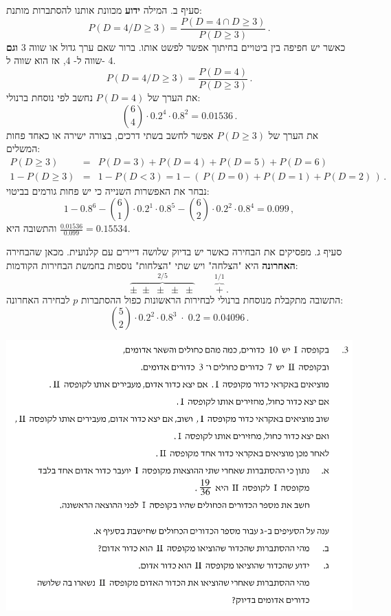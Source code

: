 \documentclass[12pt,a4paper]{article}
\begin{document}
סעיף ב. המילה
\textbf{ידוע}
מכוונת אותנו להסתברות מותנת:
\[
P(D=4/D\ge3) = \frac{P(D=4\cap D\ge 3)}{P(D\ge 3)}\,.
\]
כאשר יש חפיפה בין ביטויים בחיתוך אפשר לפשט אותו. ברור שאם ערך גדול או שווה
$3$
\textbf{וגם}
שווה ל-%
$4$,
אז הוא שווה ל-%
$4$.
\[
P(D=4/D\ge3) =\frac{P(D=4)}{P(D\ge 3)}\,.
\]
את הערך של
$P(D=4)$
נחשב לפי נוסחת ברנולי:
\[
{6\choose 4}\cdot 0.2^4 \cdot 0.8^2= 0.01536\,.
\]
את הערך של
$P(D\ge 3)$
אפשר לחשב בשתי דרכים, בצורה ישירה או כאחד פחות המשלים:
\begin{eqnarray*}
P(D\ge 3) &=& P(D=3) + P(D=4) + P(D=5) + P(D=6)\\
1-P(D\ge 3) &=& 1- P(D<3)=1-(\,P(D=0) + P(D=1) + P(D=2)\,)\,.
\end{eqnarray*}
נבחר את האפשרות השנייה כי יש פחות גורמים בביטוי:
\[
1-0.8^6-{6\choose 1}\cdot 0.2^1\cdot 0.8^5 - {6 \choose 2}\cdot 0.2^2\cdot 0.8^4=0.099\,,
\]
והתשובה היא
$\displaystyle\frac{0.01536}{0.099}=0.15534$.

סעיף ג. מפסיקים את הבחירה כאשר יש בדיוק שלושה דיירים עם קלנועית. מכאן שהבחירה 
\textbf{האחרונה} 
היא "הצלחה" ויש שתי "הצלחות" נוספות בחמשת הבחירות הקודמות:
\[
\overbrace{\pm\;\pm\;\pm\;\pm\;\pm}^{2/5}\quad\quad \overbrace{+}^{1/1}\,.
\]
התשובה מתקבלת מנוסחת ברנולי לבחירות הראשונות כפול ההסתברות
$p$
לבחירה האחרונה:
\[
{5\choose 2}\cdot 0.2^2 \cdot 0.8^3 \;\cdot\; 0.2=0.04096\,.
\]


\textbf{}

\begin{center}
\includegraphics[width=.95\textwidth]{summer-2017b-3}
\end{center}
\end{document}
